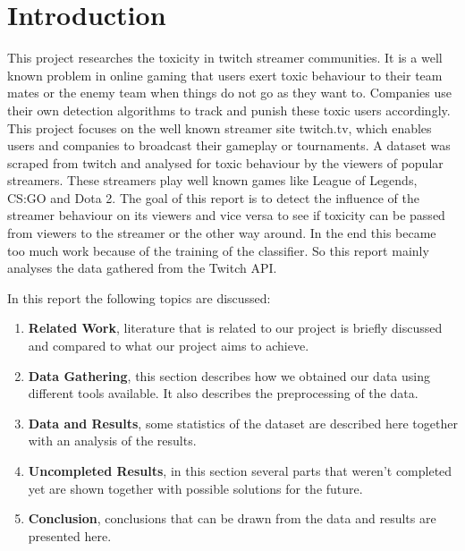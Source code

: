 \documentclass[final]{report}
\begin{document}
\chapter{Introduction}
\label{ch:introduction}

This project researches the toxicity in twitch streamer communities.
It is a well known problem in online gaming that users exert toxic behaviour to their team mates or the enemy team when things do not go as they want to.
Companies use their own detection algorithms to track and punish these toxic users accordingly.
This project focuses on the well known streamer site twitch.tv, which enables users and companies to broadcast their gameplay or tournaments.
A dataset was scraped from twitch and analysed for toxic behaviour by the viewers of popular streamers.
These streamers play well known games like League of Legends, CS:GO and Dota 2.
The goal of this report is to detect the influence of the streamer behaviour on its viewers and vice versa to see if toxicity can be passed from viewers to the streamer or the other way around. In the end this became too much work because of the training of the classifier. So this report mainly analyses the data gathered from the Twitch API.

In this report the following topics are discussed:
\begin{enumerate}
	\item \textbf{Related Work}, literature that is related to our project is briefly discussed and compared to what our project aims to achieve.
	\item \textbf{Data Gathering}, this section describes how we obtained our data using different tools available. It also describes the preprocessing of the data.
	\item \textbf{Data and Results}, some statistics of the dataset are described here together with an analysis  of the results.
	\item \textbf{Uncompleted Results}, in this section several parts that weren't completed yet are shown together with possible solutions for the future.
	\item \textbf{Conclusion}, conclusions that can be drawn from the data and results are presented here.
\end{enumerate}
\end{document}
